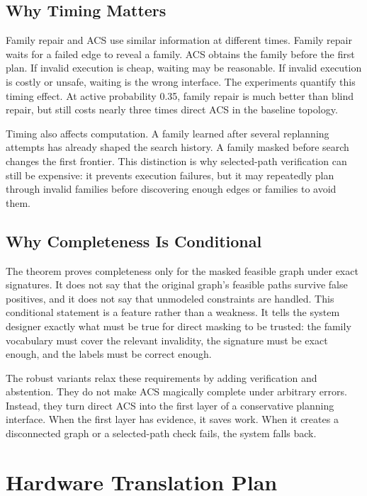 \documentclass{article}
\newcommand{\ACS}{\textsc{ACS}}
\begin{document}
\subsection{Why Timing Matters}

Family repair and \ACS{} use similar information at different times. Family repair waits for a failed edge to reveal a family. \ACS{} obtains the family before the first plan. If invalid execution is cheap, waiting may be reasonable. If invalid execution is costly or unsafe, waiting is the wrong interface. The experiments quantify this timing effect. At active probability 0.35, family repair is much better than blind repair, but still costs nearly three times direct \ACS{} in the baseline topology.

Timing also affects computation. A family learned after several replanning attempts has already shaped the search history. A family masked before search changes the first frontier. This distinction is why selected-path verification can still be expensive: it prevents execution failures, but it may repeatedly plan through invalid families before discovering enough edges or families to avoid them.

\subsection{Why Completeness Is Conditional}

The theorem proves completeness only for the masked feasible graph under exact signatures. It does not say that the original graph's feasible paths survive false positives, and it does not say that unmodeled constraints are handled. This conditional statement is a feature rather than a weakness. It tells the system designer exactly what must be true for direct masking to be trusted: the family vocabulary must cover the relevant invalidity, the signature must be exact enough, and the labels must be correct enough.

The robust variants relax these requirements by adding verification and abstention. They do not make \ACS{} magically complete under arbitrary errors. Instead, they turn direct \ACS{} into the first layer of a conservative planning interface. When the first layer has evidence, it saves work. When it creates a disconnected graph or a selected-path check fails, the system falls back.

\section{Hardware Translation Plan}
\end{document}
